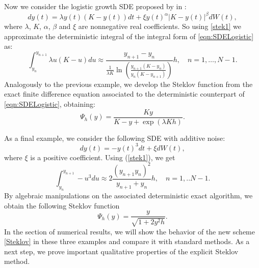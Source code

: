 	\begin{example}\label{subsec33}
		Now we consider the logistic growth SDE proposed by \citeauthor{Schurz2007} in \cite{Schurz2007}:
		\begin{equation}\label{eqn:SDELogistic}
			dy(t)= \lambda y(t)(K-y(t))dt+
			\xi y(t)^\alpha|K-y(t)|^\beta dW(t),
		\end{equation}
		where $\lambda$, $K$, $\alpha$, $\beta$ and  $\xi$ are nonnegative real coefficients.
		So using \eqref{stek1} we approximate the deterministic integral of the integral form
		of \eqref{eqn:SDELogistic} as:
		$$
			\int_{y_n}^{y_{n+1}} \lambda u(K-u) du\approx
			\frac{y_{n+1}-y_{n}}
			{
			\frac{1}{\lambda K}
				\ln
				\left(
					\frac{y_{n+1}(K-y_n)}{y_n(K-y_{{n+1}})}
				\right)
			} h, \quad n=1,\dots,N-1.
		$$
		Analogously to the previous example, we develop the Steklov function from the exact
		finite difference equation associated to the deterministic counterpart of
		\eqref{eqn:SDELogistic}, obtaining:
		\begin{equation}\label{psi2}
			\Psi_h(y)=
		\frac{K y}
		{K-y+\exp(\lambda K h)}.
		\end{equation}
	\end{example}
%
	\begin{example}\label{subsec32}
		As a final example, we consider the following SDE with additive noise:
		\begin{equation}\label{integral2}
			dy(t)= - y(t)^3dt +  \xi dW(t), 
		\end{equation}
		where $\xi$ is a positive  coefficient. Using (\ref{stek1}), we get
		$$
			\int_{y_n}^{y_{n+1}} -u^3 du
			\approx
			2\frac{(y_{n+1}y_n)^2}{y_{n+1}+y_n}h,\quad n=1,..N-1.
		$$
		By algebraic manipulations on the associated deterministic exact algorithm, we obtain
		the following Steklov function 
		\begin{equation}\label{psi3}
			\Psi_h(y)=\frac{y}{\sqrt{1+2y^2h}}.
		\end{equation}
		In the section of numerical results, we will show the behavior of the new scheme
		\eqref{Steklov} in these three examples and compare it with standard
		methods. As a next step, we prove important qualitative properties of the explicit
		Steklov method.
	\end{example}